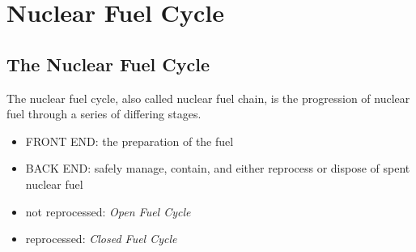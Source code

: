 \section{Nuclear Fuel Cycle}

\subsection{The Nuclear Fuel Cycle}

\begin{definition}
    The nuclear fuel cycle, also called nuclear fuel chain, is the progression of nuclear fuel through a series of differing stages. 
\end{definition}

\begin{itemize}
    \item FRONT END: the preparation of the fuel
    \item BACK END: safely manage, contain, and either reprocess or dispose of spent nuclear fuel
\end{itemize}

\begin{itemize}
    \item not reprocessed: {\itshape Open Fuel Cycle}
    \item reprocessed: {\itshape Closed Fuel Cycle}
\end{itemize}

